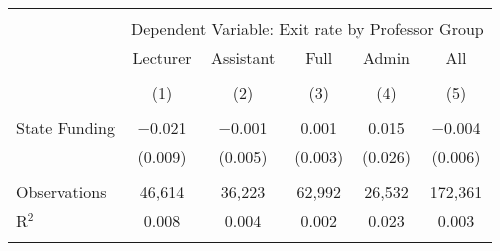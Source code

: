 
\begin{tabular}{@{\extracolsep{5pt}}lccccc} 
\\[-1.8ex]\hline 
\hline \\[-1.8ex] 
 & \multicolumn{5}{c}{Dependent Variable: Exit rate by Professor Group} \\ 
\cline{2-6} 
 & Lecturer & Assistant & Full & Admin & All \\ 
\\[-1.8ex] & (1) & (2) & (3) & (4) & (5)\\ 
\hline \\[-1.8ex] 
 State Funding & $-$0.021 & $-$0.001 & 0.001 & 0.015 & $-$0.004 \\ 
  & (0.009) & (0.005) & (0.003) & (0.026) & (0.006) \\ 
 \hline \\[-1.8ex] 
Observations & 46,614 & 36,223 & 62,992 & 26,532 & 172,361 \\ 
R$^{2}$ & 0.008 & 0.004 & 0.002 & 0.023 & 0.003 \\ 
\hline 
\hline \\[-1.8ex] 
\end{tabular} 
